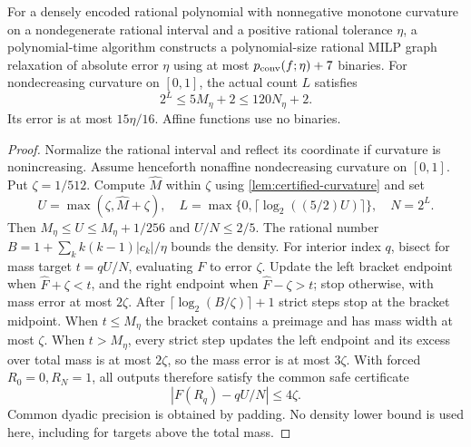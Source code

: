 \begin{theorem}\label{thm:compiled-curvature}
For a densely encoded rational polynomial with nonnegative monotone
curvature on a nondegenerate rational interval and a positive rational
tolerance $\eta$, a polynomial-time algorithm constructs
a polynomial-size rational MILP graph relaxation of absolute error
$\eta$ using at most $p_{\mathrm{conv}}(f;\eta)+7$ binaries.
For nondecreasing curvature on $[0,1]$, the actual count $L$ satisfies
\begin{equation}\label{eq:compiled-mass-count}
 2^L\le5M_\eta+2\le120N_\eta+2.
\end{equation}
Its error is at most $15\eta/16$. Affine functions use no binaries.
\end{theorem}
\begin{proof}
Normalize the rational interval and reflect its coordinate if curvature
is nonincreasing. Assume henceforth nonaffine nondecreasing curvature on
$[0,1]$. Put $\zeta=1/512$. Compute $\widehat M$ within $\zeta$
using \cref{lem:certified-curvature} and set
\[
 U=\max(\zeta,\widehat M+\zeta),\quad
 L=\max\{0,\lceil\log_2((5/2)U)\rceil\},\quad N=2^L.
\]
Then $M_\eta\le U\le M_\eta+1/256$ and $U/N\le2/5$.
The rational number $B=1+\sum_k k(k-1)|c_k|/\eta$ bounds the
density. For interior index $q$, bisect for mass target $t=qU/N$,
evaluating $F$ to error $\zeta$. Update the left bracket endpoint when
$\widehat F+\zeta<t$, and the right endpoint when
$\widehat F-\zeta>t$; stop
otherwise, with mass error at most $2\zeta$. After
$\lceil\log_2(B/\zeta)\rceil+1$ strict steps stop at the bracket
midpoint. When $t\le M_\eta$ the bracket contains a preimage and
has mass width at most $\zeta$. When $t>M_\eta$, every strict step
updates the left endpoint and its excess over total mass is at most $2\zeta$, so
the mass error is at most $3\zeta$. With forced $R_0=0,R_N=1$,
all outputs therefore satisfy the common safe certificate
\begin{equation}\label{eq:mass-knot-certificate}
 |F(R_q)-qU/N|\le4\zeta.
\end{equation}
Common dyadic precision is obtained by padding. No density lower bound
is used here, including for targets above the total mass.


\end{proof}
